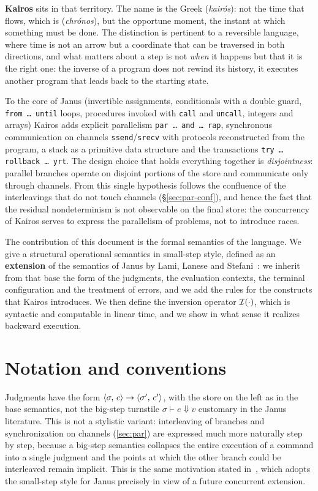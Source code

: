 \medskip
\noindent
\textbf{Kairos} sits in that territory. The name is the Greek
\kairosgr{} (\emph{kairós}): not the time that flows, which is \chronosgr{}
(\emph{chrónos}), but the opportune moment, the instant at which something must be done. The distinction is
pertinent to a reversible language, where time is not an arrow but a
coordinate that can be traversed in both directions, and what matters about a step is not
\emph{when} it happens but that it is the right one: the inverse of a program does not
rewind its history, it executes another program that leads back to the starting state.

To the core of Janus (invertible assignments, conditionals with a double guard,
\texttt{from\,\dots\,until} loops, procedures invoked with \texttt{call} and
\texttt{uncall}, integers and arrays) Kairos adds explicit parallelism
\texttt{par\,\dots\,and\,\dots\,rap}, synchronous communication on channels
\texttt{ssend}/\texttt{srecv} with protocols reconstructed from the program, a stack as a primitive data structure
and the transactions \texttt{try\,\dots\,rollback\,\dots\,yrt}.
The design choice that holds everything together is \emph{disjointness}: parallel branches
operate on disjoint portions of the store and communicate only through
channels. From this single hypothesis follows the confluence of the interleavings that
do not touch channels (\S\ref{sec:par-conf}), and hence the fact that the
residual nondeterminism is not observable on the final store: the
concurrency of Kairos serves to express the parallelism of problems, not to
introduce races.

\medskip
\noindent
The contribution of this document is the formal semantics of the language.
We give a structural operational semantics in small-step style, defined as an
\textbf{extension} of the semantics of Janus by Lami, Lanese and
Stefani~\cite{LamiLaneseStefani2024}: we inherit from that base the form of the
judgments, the evaluation contexts, the terminal configuration and the
treatment of errors, and we add the rules for the constructs that Kairos
introduces. We then define the inversion operator $\Inv{\cdot}$, which is syntactic and
computable in linear time, and we show in what sense it realizes backward
execution.

\section{Notation and conventions}
\label{sec:notazione}

Judgments have the form $\cfg{c}{\sigma} \to \cfg{c'}{\sigma'}$, with the store on the
left as in the base semantics, not the big-step turnstile
$\sigma \vdash e \Downarrow v$ customary in the Janus literature. This is not a
stylistic variant: interleaving of branches and synchronization on channels
(\cref{sec:par}) are expressed much more naturally step by step, because a
big-step semantics collapses the entire execution of a command into a single judgment and the
points at which the other branch could be interleaved remain implicit. This is the same motivation
stated in~\cite{LamiLaneseStefani2024}, which adopts the small-step style for Janus
precisely in view of a future concurrent extension.

